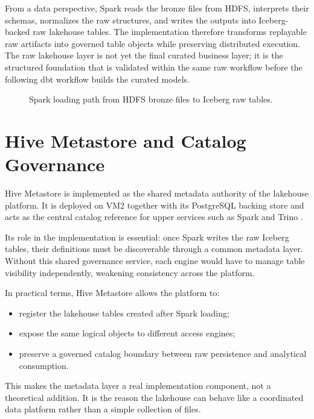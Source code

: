 From a data perspective, Spark reads the bronze files from HDFS, interprets their schemas, normalizes the raw structures, and writes the outputs into Iceberg-backed raw lakehouse tables. The implementation therefore transforms replayable raw artifacts into governed table objects while preserving distributed execution. The raw lakehouse layer is not yet the final curated business layer; it is the structured foundation that is validated within the same raw workflow before the following dbt workflow builds the curated models.

\begin{figure}[H]
    \centering
    
    \caption{Spark loading path from HDFS bronze files to Iceberg raw tables.}
    \label{fig:chapter5-spark-raw-load}
\end{figure}

\section{Hive Metastore and Catalog Governance}
Hive Metastore is implemented as the shared metadata authority of the lakehouse platform. It is deployed on VM2 together with its PostgreSQL backing store and acts as the central catalog reference for upper services such as Spark and Trino \cite{apache_hive_docs,apache_iceberg_docs}.

Its role in the implementation is essential: once Spark writes the raw Iceberg tables, their definitions must be discoverable through a common metadata layer. Without this shared governance service, each engine would have to manage table visibility independently, weakening consistency across the platform.

In practical terms, Hive Metastore allows the platform to:
\begin{itemize}
    \item register the lakehouse tables created after Spark loading;
    \item expose the same logical objects to different access engines;
    \item preserve a governed catalog boundary between raw persistence and analytical consumption.
\end{itemize}

This makes the metadata layer a real implementation component, not a theoretical addition. It is the reason the lakehouse can behave like a coordinated data platform rather than a simple collection of files.

